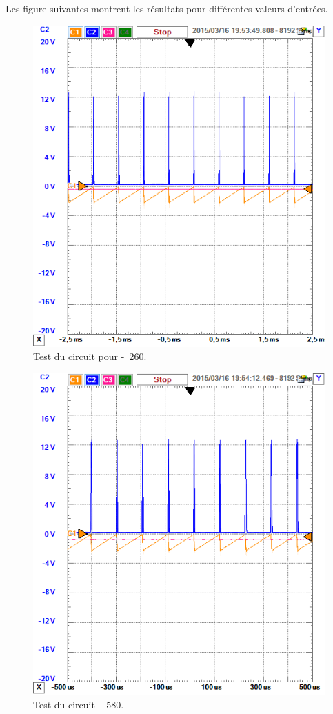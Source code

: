 Les figure suivantes montrent les résultats pour
différentes valeurs d'entrées.

\begin{figure}[ht]
	\centering
	\includegraphics[scale=0.7]{img/circuit-test-260mv.png}
	\caption{Test du circuit pour \unit{-260}{\milli\volt}.}
	\label{fig:test-260}
\end{figure}

\begin{figure}[ht]
	\centering
	\includegraphics[scale=0.7]{img/circuit-test-580mv.png}
	\caption{Test du circuit \unit{-580}{\milli\volt}.}
	\label{fig:test-580}
\end{figure}


